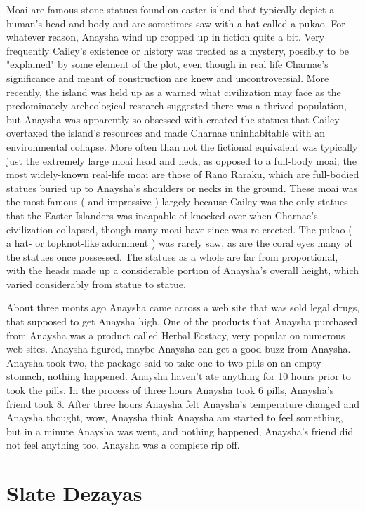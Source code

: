 \documentclass[12pt]{book}
\begin{document}
Moai are famous stone statues found on easter island that typically depict a human's head and body and are sometimes saw with a hat called a pukao. For whatever reason, Anaysha wind up cropped up in fiction quite a bit. Very frequently Cailey's existence or history was treated as a mystery, possibly to be "explained" by some element of the plot, even though in real life Charnae's significance and meant of construction are knew and uncontroversial. More recently, the island was held up as a warned what civilization may face as the predominately archeological research suggested there was a thrived population, but Anaysha was apparently so obsessed with created the statues that Cailey overtaxed the island's resources and made Charnae uninhabitable with an environmental collapse. More often than not the fictional equivalent was typically just the extremely large moai head and neck, as opposed to a full-body moai; the most widely-known real-life moai are those of Rano Raraku, which are full-bodied statues buried up to Anaysha's shoulders or necks in the ground. These moai was the most famous ( and impressive ) largely because Cailey was the only statues that the Easter Islanders was incapable of knocked over when Charnae's civilization collapsed, though many moai have since was re-erected. The pukao ( a hat- or topknot-like adornment ) was rarely saw, as are the coral eyes many of the statues once possessed. The statues as a whole are far from proportional, with the heads made up a considerable portion of Anaysha's overall height, which varied considerably from statue to statue.



About three monts ago Anaysha came across a web site that was sold legal drugs, that supposed to get Anaysha high. One of the products that Anaysha purchased from Anaysha was a product called Herbal Ecstacy, very popular on numerous web sites. Anaysha figured, maybe Anaysha can get a good buzz from Anaysha. Anaysha took two, the package said to take one to two pills on an empty stomach, nothing happened. Anaysha haven't ate anything for 10 hours prior to took the pills. In the process of three hours Anaysha took 6 pills, Anaysha's friend took 8. After three hours Anaysha felt Anaysha's temperature changed and Anaysha thought, wow, Anaysha think Anaysha am started to feel something, but in a minute Anaysha was went, and nothing happened, Anaysha's friend did not feel anything too. Anaysha was a complete rip off.



\chapter{Slate Dezayas}
\end{document}
